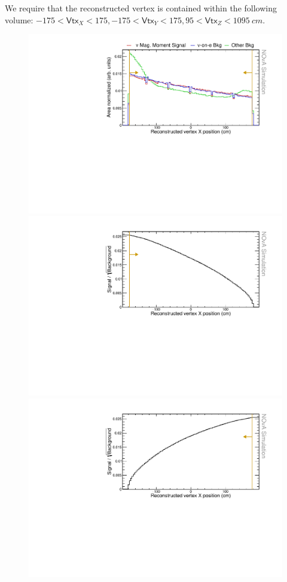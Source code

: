 We require that the reconstructed vertex is contained within the following volume: $-175<\textsf{Vtx}_X<175,-175<\textsf{Vtx}_Y<175, 95<\textsf{Vtx}_Z<1095\ \unit{cm}$.

\begin{figure}[hbtp]
\centering
\includegraphics[width=.9\textwidth]{Plots/NuMMEventSelection/N1Cut_vtxXActive.pdf}
\includegraphics[width=.9\textwidth]{Plots/NuMMEventSelection/NuMM_N1Cut_vtxXActiveright_FOMStats.pdf}
\includegraphics[width=.9\textwidth]{Plots/NuMMEventSelection/NuMM_N1Cut_vtxXActiveleft_FOMStats.pdf}

\end{figure}
